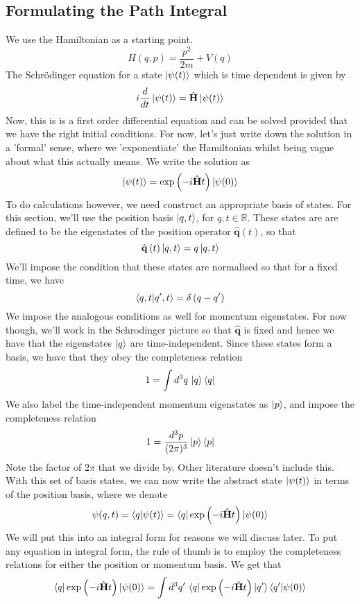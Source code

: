 \documentclass[11pt, oneside]{article}   	%
\theoremstyle{slanted}
\renewcommand{\op}[1]{\hat{\mathbf{#1}}}
\begin{document}
\begin{itemize}
\subsection{Formulating the Path Integral} 
We use the Hamiltonian 
as a starting point. 
\[
	H ( q, p ) = \frac{p ^ 2 }{ 2m } + V ( q ) 
\] The Schrödinger equation for 
a state $ \ket{ \psi ( t ) } $ which is time dependent 
is given by 
\[
	i \frac{ d }{ dt } \ket{ \psi ( t ) }  = \op{H }  \ket{ \psi ( t ) } 
\] Now, this is 
is a first order differential equation 
and can be solved provided that 
we have the right initial conditions. 
For now, let's just write down the solution 
in a 'formal' sense, where we 'exponentiate' 
the Hamiltonian whilst being vague 
about what this actually means. 
We write the solution as 
\[
	\ket{ \psi ( t ) } = \exp\left(  - i \op{ H } t  \right)  
	\ket{ \psi ( 0 ) } 
\] To do calculations however, we 
need construct an appropriate basis of states.
For this section, we'll use 
the position basis $ \ket{ q , t } $, for 
$ q, t  \in \mathbb{ R } $. These states are 
are defined to be the eigenstates of 
the position operator $ \op{q} \left( t  \right)  $, 
so that 
\[
	\op{q } \left( t   \right) \ket{ q , t }  = q \ket { q , t }   
\] We'll impose the condition 
that these states are normalised 
so that for a fixed time, we have 
\[
 \bra{q , t}\ket{ q ' , t } = \delta \left( q - q '  \right) 
\] We impose the analogous conditions as 
well for momentum eigenstates. For now though, we'll work in 
the Schrodinger picture so that $ \op{q } $ is fixed
and hence we have that the eigenstates $ \ket{ q } $ 
are time-independent. Since these states form 
a basis, we have that they obey the completeness 
relation 
\[
	1 = \int d ^ 3 q \, \ket{ q }\bra{ q } 
\] We also label the time-independent 
momentum eigenstates as $ \ket{ p } $, 
and impose the completeness relation 
\[
	1 = \frac{ d ^ 3 p }{ ( 2 \pi )^{ 3 }  } \ket{ p } \bra{ p } 
\] Note the factor of $ 2 \pi $ that we divide by. 
Other literature doesn't include this. 
With this set of basis states, we can 
now write the abstract state $ \ket{ \psi( t ) } $ 
in terms of the position basis, where we denote 
\[
	\psi ( q, t ) = \bra{ q}\ket{ \psi  ( t ) } 
	=  \bra{q } \exp\left(  - i \op{H }t  \right)\ket{ \psi ( 0 ) } 
\] We will put this into an integral form 
for reasons we will discuss later. 
To put any equation in integral 
form, the rule of thumb is 
to employ the completeness relations 
for either the position or momentum basis.
We get that 
\begin{align*}
	\bra{ q } \exp\left( - i \op{ H } t  \right) \ket{ \psi ( 0 ) } &=  \int d ^ 3 q '\,  \bra{ q }\exp \left(  - i \op{ H } t  \right)\ket{ q ' } \bra{ q ' }\ket{\psi ( 0 )}    \\ 

\end{align*}
\end{itemize}
\end{document}
